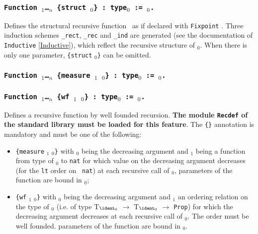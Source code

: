 \subsubsection{\tt Function {\ident} {\binder$_1$}\ldots{\binder$_n$}
 {\tt \{}{\tt struct} \ident$_0${\tt\}} : type$_0$ := \term$_0$.
}

Defines the structural recursive  function \ident\ as if declared with
\texttt{Fixpoint}   .  Three   induction   schemes  {\tt\ident\_rect},
{\tt\ident\_rec}   and  {\tt\ident\_ind}   are   generated  (see   the
documentation of {\tt  Inductive} \ref{Inductive}), which reflect the
recursive structure  of \term$_0$. When  there is only  one parameter,
{\tt \{struct} \ident$_0${\tt\}} can be omitted.

\subsubsection{\tt Function {\ident} {\binder$_1$}\ldots{\binder$_n$}
 {\tt \{}{\tt measure \term$_1$} \ident$_0${\tt\}} : type$_0$ := \term$_0$.
}

\subsubsection{\tt Function {\ident} {\binder$_1$}\ldots{\binder$_n$}
 {\tt \{}{\tt wf \term$_1$} \ident$_0${\tt\}} : type$_0$ := \term$_0$.
}

Defines a recursive function by well founded recursion. \textbf{The
module \texttt{Recdef} of the standard library must be loaded for this
feature}. The {\tt \{\}} annotation is mandatory and must be one of
the following:
\begin{itemize}
\item {\tt \{measure} \term$_1$ \ident$_0${\tt\}} with \ident$_0$
      being the decreasing argument and \term$_1$ being a function
      from type of \ident$_0$ to \texttt{nat} for which value on the
      decreasing argument decreases (for the {\tt lt} order on {\tt
      nat}) at each recursive call of \term$_0$, parameters of the
      function are bound in  \term$_0$;
\item {\tt \{wf} \term$_1$ \ident$_0${\tt\}} with \ident$_0$ being
      the decreasing argument and \term$_1$ an ordering relation on
      the type of \ident$_0$ (i.e. of type T$_{\ident_0}$
      $\rightarrow$ T$_{\ident_0}$ $\rightarrow$ {\tt Prop}) for which
      the decreasing argument decreases at each recursive call of
      \term$_0$. The order must be well founded. parameters of the
      function are bound in  \term$_0$.
\end{itemize} 

